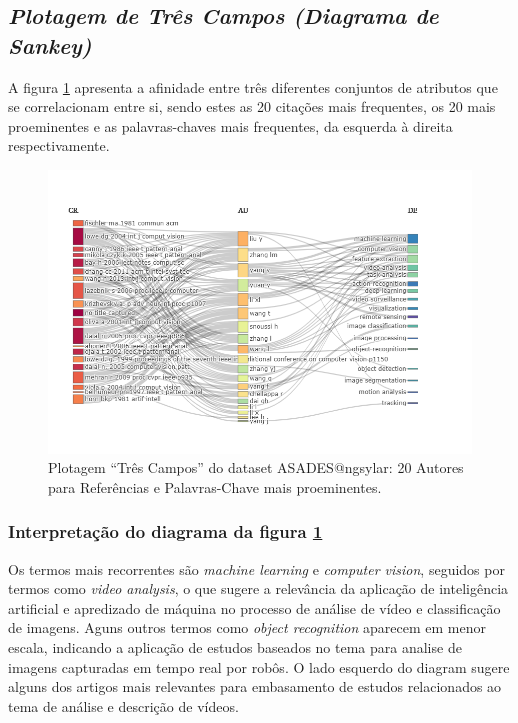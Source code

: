 \subsection{\textit{Plotagem de Três Campos (Diagrama de Sankey)}}
A figura \ref{fig:ASADES@ngsylar:ThreeFieldPlot} apresenta a afinidade entre três diferentes conjuntos de atributos que se correlacionam entre si, sendo estes as 20 citações mais frequentes, os 20 mais proeminentes e as palavras-chaves mais frequentes, da esquerda à direita respectivamente.

\begin{figure}[H]
    \centering
    \includegraphics[angle=0,width=1\textwidth]{experiments/ngsylar/PesqBibliogr/Imagens/ASADES-TFPRefAutKeyw.png}
    \caption{Plotagem ``Três Campos'' do dataset ASADES@ngsylar: 20 Autores para Referências e Palavras-Chave mais proeminentes.}
    \label{fig:ASADES@ngsylar:ThreeFieldPlot}
\end{figure}

\subsubsection{Interpretação do diagrama da figura \ref{fig:ASADES@ngsylar:ThreeFieldPlot}}
Os termos mais recorrentes são \textit{machine learning} e \textit{computer vision}, seguidos por termos como \textit{video analysis}, o que sugere a relevância da aplicação de inteligência artificial e apredizado de máquina no processo de análise de vídeo e classificação de imagens.
Aguns outros termos como \textit{object recognition} aparecem em menor escala, indicando a aplicação de estudos baseados no tema para analise de imagens capturadas em tempo real por robôs.
O lado esquerdo do diagram sugere alguns dos artigos mais relevantes para embasamento de estudos relacionados ao tema de análise e descrição de vídeos.

